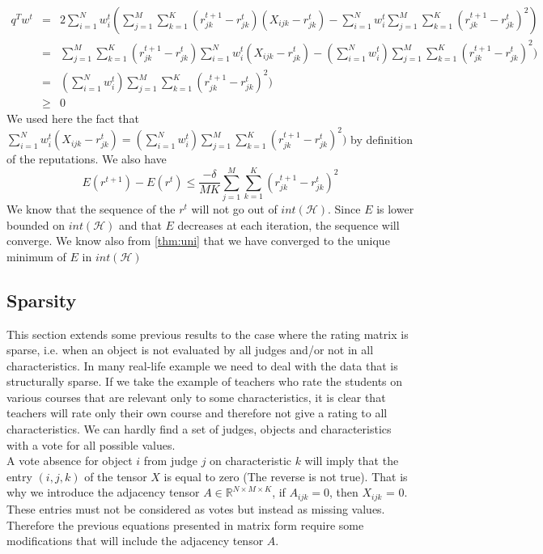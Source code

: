 \documentclass[12pt,a4paper]{article}
\begin{document}
\begin{eqnarray*}
q^Tw^t & = & 2 \sum_{i=1}^N w^t_i (\sum_{j=1}^M \sum_{k=1}^K (r^{t+1}_{jk}-r^t_{jk})(X_{ijk}-r^t_{jk}) - \sum_{i=1}^N w^t_i \sum_{j=1}^M \sum_{k=1}^K  (r^{t+1}_{jk} - r^t_{jk})^2)\\
& = & \sum_{j=1}^M \sum_{k=1}^K (r^{t+1}_{jk}-r^t_{jk}) \sum_{i=1}^N w^t_i (X_{ijk}-r_{jk}^t)- (\sum_{i=1}^N w^t_i) \sum_{j=1}^M \sum_{k=1}^K  (r^{t+1}_{jk} - r^t_{jk})^2)\\
& = & (\sum_{i=1}^N w^t_i) \sum_{j=1}^M \sum_{k=1}^K  (r^{t+1}_{jk} - r^t_{jk})^2)\\
& \geq & 0
\end{eqnarray*}
We used here the fact that $\sum_{i=1}^N w^t_i (X_{ijk}-r_{jk}^t) = (\sum_{i=1}^N w^t_i) \sum_{j=1}^M \sum_{k=1}^K  (r^{t+1}_{jk} - r^t_{jk})^2)$ by definition of the reputations.
We also have 
$$E(r^{t+1})- E(r^t) \leq \frac{-\delta}{MK} \sum_{j=1}^M \sum_{k=1}^K (r^{t+1}_{jk} - r^t_{jk})^2$$
We know that the sequence of the $r^t$ will not go out of $int(\mathcal{H})$.
Since $E$ is lower bounded on $int(\mathcal{H})$ and that $E$ decreases at each iteration, the sequence will converge. We know also from \ref{thm:uni} that we have converged to the unique minimum of $E$ in $int(\mathcal{H})$


\subsection{Sparsity}

This section extends some previous results to the case where the rating matrix is sparse, i.e. when an object is not evaluated by all judges and/or not in all characteristics. In many real-life example we need to deal with the data that is structurally sparse. If we take the example of teachers who rate the students on various courses that are relevant only to some characteristics, it is clear that teachers will rate only their own course and therefore not give a rating to all characteristics. We can hardly find a set of judges, objects and characteristics with a vote for all possible values.\\

A vote absence for object $i$ from judge $j$ on characteristic $k$ will imply that the entry $(i, j, k)$ of the tensor $X$ is equal to zero (The reverse is not true). That is why we introduce the adjacency tensor $A \in \mathbb{R}^{N \times M \times K}$, if $A_{ijk} = 0$, then $X_{ijk}$ = 0. These entries must not be considered as votes but instead as missing values. Therefore the previous equations presented in matrix form require some modifications that will include the adjacency tensor $A$.
\end{document}
